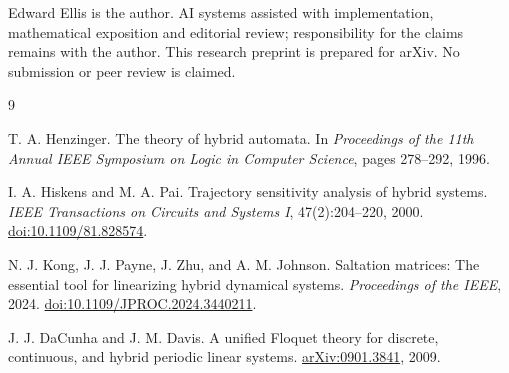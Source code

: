 \documentclass[11pt]{article}
\begin{document}
Edward Ellis is the author. AI systems assisted with implementation,
mathematical exposition and editorial review; responsibility for the claims
remains with the author. This research preprint is prepared for arXiv. No
submission or peer review is claimed.

\begin{thebibliography}{9}

T. A. Henzinger.
\newblock The theory of hybrid automata.
\newblock In \emph{Proceedings of the 11th Annual IEEE Symposium on Logic in
Computer Science}, pages 278--292, 1996.

I. A. Hiskens and M. A. Pai.
\newblock Trajectory sensitivity analysis of hybrid systems.
\newblock \emph{IEEE Transactions on Circuits and Systems I},
47(2):204--220, 2000.
\newblock \href{https://doi.org/10.1109/81.828574}{doi:10.1109/81.828574}.

N. J. Kong, J. J. Payne, J. Zhu, and A. M. Johnson.
\newblock Saltation matrices: The essential tool for linearizing hybrid
dynamical systems.
\newblock \emph{Proceedings of the IEEE}, 2024.
\newblock \href{https://doi.org/10.1109/JPROC.2024.3440211}%
{doi:10.1109/JPROC.2024.3440211}.

J. J. DaCunha and J. M. Davis.
\newblock A unified Floquet theory for discrete, continuous, and hybrid periodic
linear systems.
\newblock \href{https://arxiv.org/abs/0901.3841}{arXiv:0901.3841}, 2009.

\end{thebibliography}
\end{document}
